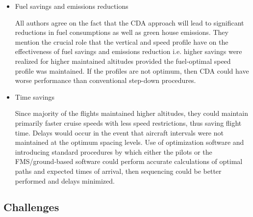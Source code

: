 \documentclass{aer1315-pretty}
\begin{document}
\begin{itemize}
\item Fuel savings and emissions reductions\par
All authors agree on the fact that the CDA approach will lead to significant reductions in fuel consumptions as well as green house emissions. 
They mention the crucial role that the vertical and speed profile have on the effectiveness of fuel savings and  emissions reduction i.e. higher savings were realized for higher maintained altitudes provided the fuel-optimal speed profile was maintained. If the profiles are not optimum, then CDA could have worse performance than conventional step-down procedures. 

\item Time savings\par
Since majority of the flights maintained higher altitudes, they could maintain primarily faster cruise speeds with less speed restrictions, thus saving flight time. Delays would occur in the event that aircraft intervals were not maintained at the optimum spacing levels. Use of optimization software and introducing standard procedures by which either the pilots or the FMS/ground-based software could perform accurate calculations of optimal paths and expected times of arrival, then sequencing could be better performed and delays minimized.
\end{itemize}

\subsection{Challenges} \label{ssec:challenges}
\end{document}
